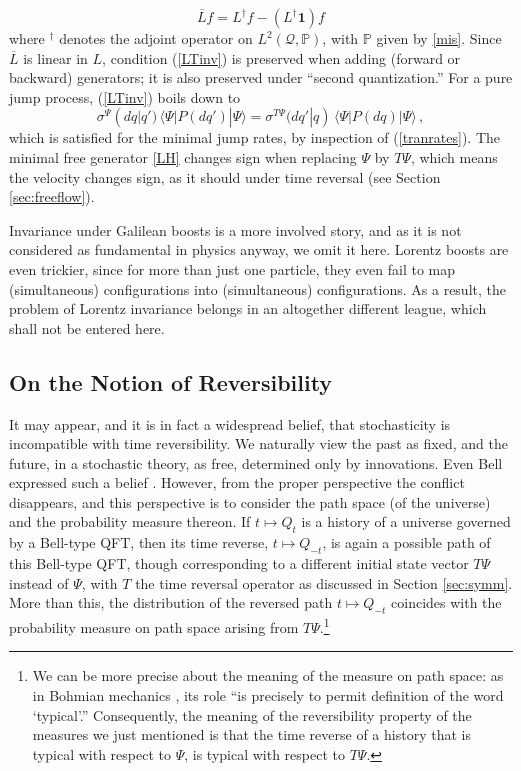 \documentclass[12pt]{article}
\newcommand{\1}{\mathbf{1}} %
\newcommand{\ov}{\overline}
\renewcommand{\sp}[2]{\langle #1 | #2 \rangle} %
\newcommand{\conf}{\mathcal{Q}} %
\newcommand{\measure}{\mathbb{P}} %
\newcommand{\pov}{{P}}%
\begin{document}
\begin{equation}\label{LT}
   \ov{L} f = L^\dag f - (L^\dag\1) f
\end{equation}
where $^\dag$ denotes the adjoint operator on $L^2(\conf,\measure)$,
with $\measure$ given by \eqref{mis}.  Since $\ov{L}$ is linear in
$L$, condition (\ref{LTinv}) is preserved when adding (forward or
backward) generators; it is also preserved under ``second
quantization.''  For a pure jump process, (\ref{LTinv}) boils down to
\begin{equation}\label{jumprevers}
   \sigma^{\Psi}(dq|q') \, \sp{\Psi}{\pov(dq') |\Psi} = \sigma^{T \Psi}
   (dq'|q) \, \sp{\Psi}{\pov(dq) |\Psi}\,,
\end{equation}
which is satisfied for the minimal jump rates, by inspection of
(\ref{tranrates}).  The minimal free generator \eqref{LH} changes sign
when replacing $\Psi$ by $T\Psi$, which means the velocity changes
sign, as it should under time reversal (see Section
\ref{sec:freeflow}).

Invariance under Galilean boosts is a more involved story, and as it
is not considered as fundamental in physics anyway, we omit it here.
Lorentz boosts are even trickier, since for more than just one
particle, they even fail to map (simultaneous) configurations into
(simultaneous) configurations.  As a result, the problem of Lorentz
invariance belongs in an altogether different league, which shall not
be entered here.


\subsection{On the Notion of Reversibility}

   It may appear, and it is in fact a widespread belief, that
   stochasticity is incompatible with time reversibility.  We naturally
   view the past as fixed, and the future, in a stochastic theory, as
   free, determined only by innovations. Even Bell expressed such a
   belief \cite[p.~177]{Bellbook}. However, from the proper perspective
   the conflict disappears, and this perspective is to consider the
   path space (of the universe) and the probability measure thereon. If
   $t\mapsto Q_t$ is a history of a universe governed by a Bell-type 
QFT, then
   its time reverse, $t\mapsto Q_{-t}$, is again a possible path of this
   Bell-type QFT, though corresponding to a different initial state
   vector $T\Psi$ instead of $\Psi$, with $T$ the time reversal
   operator as discussed in Section \ref{sec:symm}. More than this, the
   distribution of the reversed path $t\mapsto Q_{-t}$ coincides with the
   probability measure on path space arising from $T\Psi$.\footnote{We
   can be more precise about the meaning of the measure on path space:
   as  in Bohmian mechanics \cite{DGZ}, its role ``is precisely to
   permit definition of the word `typical'.'' \cite[p.~129]{Bellbook}
   Consequently, the meaning of the reversibility property of the
   measures we just mentioned is that the time reverse of a history
   that is typical with respect to $\Psi$, is typical with respect to
   $T\Psi$.}
\end{document}
